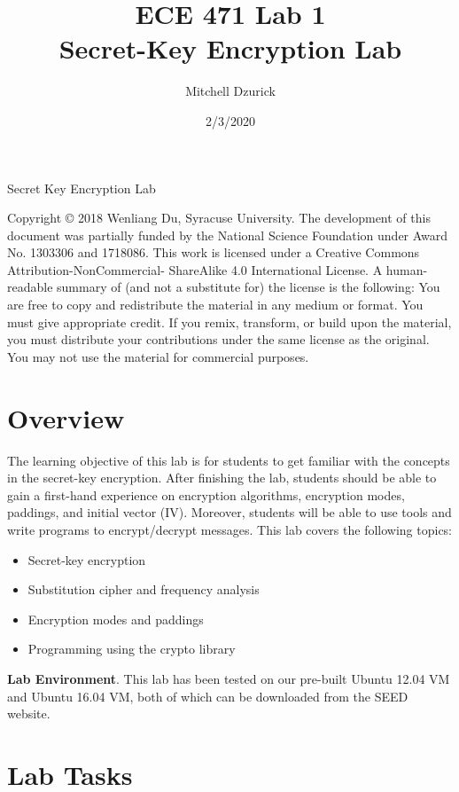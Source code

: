 \documentclass[12pt]{article}
\title {{\bf ECE 471 Lab 1} \\
\large{Secret-Key Encryption Lab}}
\author{Mitchell Dzurick}
\date{2/3/2020}
\begin{document}
\maketitle

\tableofcontents

\clearpage


Secret Key Encryption Lab

Copyright © 2018 Wenliang Du, Syracuse University. The development of this document was partially funded by the National Science Foundation under Award No. 1303306 and 1718086. This work is licensed under a Creative Commons Attribution-NonCommercial- ShareAlike 4.0 International License. A human-readable summary of (and not a substitute for) the license is the following: You are free to copy and redistribute the material in any medium or format. You must give appropriate credit. If you remix, transform, or build upon the material, you must distribute your contributions under the same license as the original. You may not use the material for commercial purposes.

\section{Overview}

The learning objective of this lab is for students to get familiar with the concepts in the secret-key encryption. After finishing the lab, students should be able to gain a first-hand experience on encryption algorithms, encryption modes, paddings, and initial vector (IV). Moreover, students will be able to use tools and write programs to encrypt/decrypt messages. This lab covers the following topics:

    \begin{itemize}
        \item Secret-key encryption
        \item Substitution cipher and frequency analysis
        \item Encryption modes and paddings
        \item Programming using the crypto library
    \end{itemize}

\textbf{Lab Environment}. This lab has been tested on our pre-built Ubuntu 12.04 VM and Ubuntu 16.04 VM, both of which can be downloaded from the SEED website.

\clearpage

\section{Lab Tasks}
\end{document}
